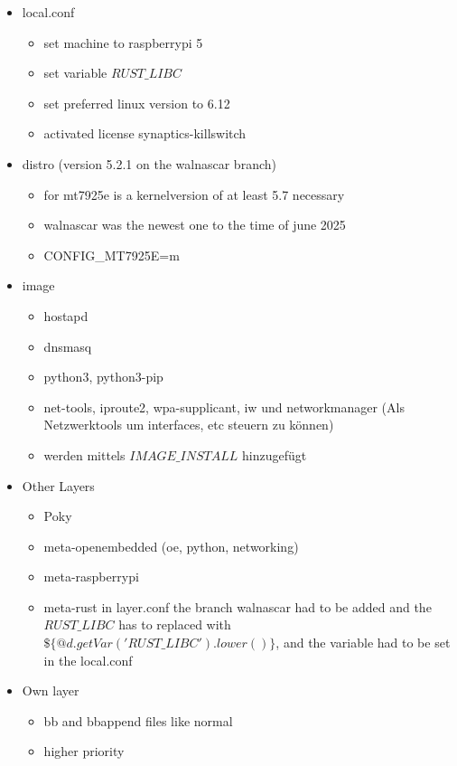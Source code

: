 \begin{itemize}
    \item local.conf \begin{itemize}
        \item set machine to raspberrypi 5
        \item set variable $RUST\_LIBC$
        \item set preferred linux version to 6.12
        \item activated license synaptics-killswitch
    \end{itemize}
    \item distro (version 5.2.1 on the walnascar branch) \begin{itemize}
        \item for mt7925e is a kernelversion of at least 5.7 necessary
        \item walnascar was the newest one to the time of june 2025
        \item CONFIG\_MT7925E=m
    \end{itemize}
    \item image \begin{itemize}
        \item hostapd
        \item dnsmasq
        \item python3, python3-pip
        \item net-tools, iproute2, wpa-supplicant, iw und networkmanager (Als Netzwerktools um interfaces, etc steuern zu können)
        \item werden mittels $IMAGE\_INSTALL$ hinzugefügt
        \end{itemize}
    \item Other Layers \begin{itemize}
        \item Poky
        \item meta-openembedded (oe, python, networking)
        \item meta-raspberrypi
        \item meta-rust in layer.conf the branch walnascar had to be added and the $RUST\_LIBC$ has to replaced with $\$\{@d.getVar('RUST\_LIBC').lower()\}$, and the variable had to be set in the local.conf
    \end{itemize}
    \item Own layer \begin{itemize}
        \item bb and bbappend files like normal
        \item higher priority

\end{itemize}
\end{itemize}
